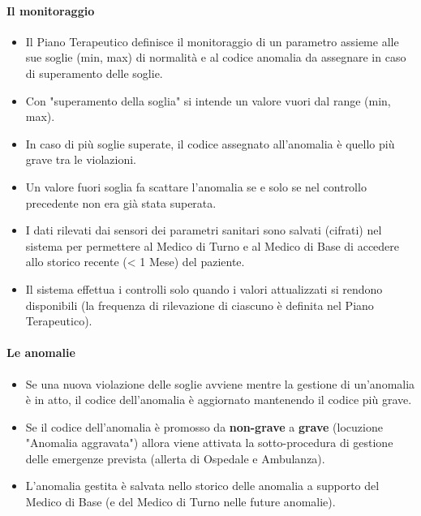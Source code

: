 \documentclass[a4paper,11pt,oneside, table]{article}
\begin{document}
\paragraph{Il monitoraggio}
\begin{itemize}
  \item Il Piano Terapeutico definisce il monitoraggio di un parametro assieme alle sue soglie (min, max) di normalit\`a e al codice anomalia da assegnare in caso di superamento delle soglie.
  \item Con "superamento della soglia" si intende un valore vuori dal range (min, max).
  \item In caso di pi\`u soglie superate, il codice assegnato all'anomalia \`e quello pi\`u grave tra le violazioni.
  \item Un valore fuori soglia fa scattare l'anomalia se e solo se nel controllo precedente non era gi\`a stata superata.
  \item I dati rilevati dai sensori dei parametri sanitari sono salvati (cifrati) nel sistema per permettere al Medico di Turno e al Medico di Base di accedere allo storico recente (< 1 Mese) del paziente.
  \item Il sistema effettua i controlli solo quando i valori attualizzati si rendono disponibili (la frequenza di rilevazione di ciascuno \`e definita nel Piano Terapeutico).
\end{itemize}

\paragraph{Le anomalie}
\begin{itemize}
  \item Se una nuova violazione delle soglie avviene mentre la gestione di un'anomalia \`e in atto, il codice dell'anomalia \`e aggiornato mantenendo il codice pi\`u grave.
  \item Se il codice dell'anomalia \`e promosso da \textbf{non-grave} a \textbf{grave} (locuzione "Anomalia aggravata") allora viene attivata la sotto-procedura di gestione delle emergenze prevista (allerta di Ospedale e Ambulanza).
  \item L'anomalia gestita \`e salvata nello storico delle anomalia a supporto del Medico di Base (e del Medico di Turno nelle future anomalie).
\end{itemize}
\end{document}
